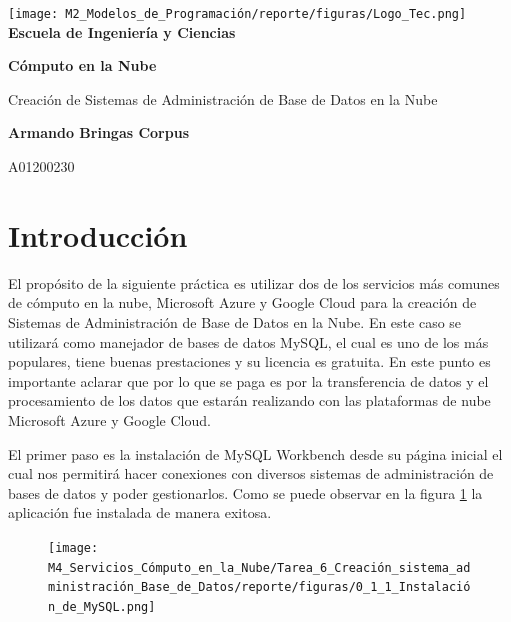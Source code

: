\documentclass[12pt,a4paper]{article}
\begin{document}
\begin{titlepage}
    \centering
    \texttt{[image: M2\_Modelos\_de\_Programación/reporte/figuras/Logo\_Tec.png]}\\
    \vspace{.5cm}
    \bfseries\large Escuela de Ingeniería y Ciencias
        
    \vspace{5cm}
    \centering
    \textbf{\Huge Cómputo en la Nube}
    \vspace{0.5cm}
        
    {\Large Creación de Sistemas de Administración de Base de Datos en la Nube}

    \vspace{5cm}
        
    \textbf{\LARGE Armando Bringas Corpus}
        
    \vspace{0.5cm}
        
    {\large A01200230}
        
    \vfill
        
\end{titlepage}

\section{Introducción}

El propósito de la siguiente práctica es utilizar dos de los servicios más comunes de cómputo en la nube, Microsoft Azure y Google Cloud para la creación de Sistemas de Administración de Base de Datos en la Nube. En este caso se utilizará como manejador de bases de datos MySQL, el cual es uno de los más populares, tiene buenas prestaciones y su licencia es gratuita. En este punto es importante aclarar que por lo que se paga es por la transferencia de datos y el procesamiento de los datos que estarán realizando con las plataformas de nube Microsoft Azure y Google Cloud. 

\vspace{1em}

El primer paso es la instalación de MySQL Workbench desde su página inicial el cual nos permitirá hacer conexiones con diversos sistemas de administración de bases de datos y poder gestionarlos. Como se puede observar en la figura \ref{fig:mySQL_1} la aplicación fue instalada de manera exitosa.

\begin{figure}[H]
    \centering
    \texttt{[image: M4\_Servicios\_Cómputo\_en\_la\_Nube/Tarea\_6\_Creación\_sistema\_administración\_Base\_de\_Datos/reporte/figuras/0\_1\_1\_Instalación\_de\_MySQL.png]}
    \label{fig:mySQL_1}
\end{figure}
\end{document}
